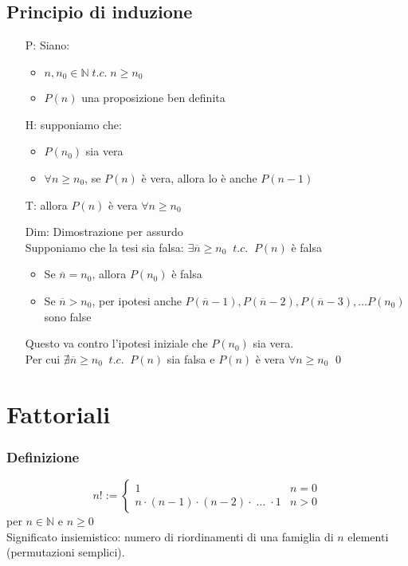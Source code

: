 \documentclass[a4paper]{article}
\begin{document}
\subsection{Principio di induzione}
\begin{itemize}
	\item[P:] Siano:
	\begin{itemize}
		\item \(n, n_0 \in \mathbb{N} \; t.c. \; n \geq n_0\)
		\item \(P(n)\) una proposizione ben definita
	\end{itemize}
	\item[H:] supponiamo che:
	\begin{itemize}
		\item \(P(n_0)\) sia vera
		\item \(\forall n \geq n_0\), se \(P(n)\) è vera, allora lo è anche \(P(n-1)\)
	\end{itemize}
	\item[T:] allora \(P(n)\) è vera \(\forall n \geq n_0\)
	\item[Dim:] Dimostrazione per assurdo \\
	Supponiamo che la tesi sia falsa: \(\exists \overline{n} \geq n_0 \;\; t.c. \;\; P(n)\) è falsa
	\begin{itemize}
		\item Se \(\overline{n} = n_0\), allora \(P(n_0)\) è falsa
		\item Se \(\overline{n} > n_0\), per ipotesi anche \(P(\overline{n} - 1), P(\overline{n} - 2), P(\overline{n} - 3), \dots P(n_0)\) sono false
	\end{itemize}
	Questo va contro l'ipotesi iniziale che \(P(n_0)\) sia vera. \\
	Per cui \(\nexists \overline{n} \geq n_0 \;\; t.c. \;\; P(n)\) sia falsa e \(P(n)\) è vera \(\forall n \geq n_0\) \qed
\end{itemize}

\newpage

\section{Fattoriali}
\subsubsection*{Definizione}
\begin{equation*}
	n! :=
	\begin{cases}
		1 & n = 0 \\
		n \cdot (n-1) \cdot (n-2) \cdot \; \dots \; \cdot 1 & n > 0 
	\end{cases}
\end{equation*}
per \(n \in \mathbb{N}\) e \(n \geq 0\) \\
Significato insiemistico: numero di riordinamenti di una famiglia di \(n\) elementi (permutazioni semplici).
\end{document}
